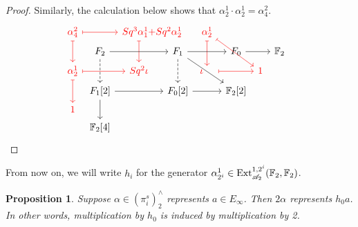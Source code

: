 \documentclass[11pt, titlepage]{article} %
\def\bb{\ensuremath\mathbb}
\def\A{\ensuremath{\mathscr{A}_2}}
\DeclareMathOperator{\Ext}{Ext}
\def\textcolour{\textcolor}
\numberwithin{equation}{subsection}
\theoremstyle{plain}
\newtheorem{proposition}[theorem]{Proposition}
\theoremstyle{definition}
\begin{document}
\begin{proof}
Similarly, the calculation below shows that \(\alpha^1_2\cdot \alpha^1_2=\alpha^2_4\).
\[\begin{tikzcd}[row sep = 0.8ex, column sep=0.8ex]
\textcolour{red}{\alpha^2_4} \arrow[rr, "", mapsto, red] \arrow[dd, swap, "", red, mapsto]  & & \textcolour{red}{Sq^3\alpha^1_1}\textcolour{red}{+}\mathrlap{\textcolour{red}{Sq^2\alpha^1_2}}  \arrow[dd, ""', red, mapsto] & & \textcolour{red}{\alpha^{1}_{2}}  \arrow[dd, ""', red, mapsto] \arrow[rrdd, "", red, mapsto] & && \\
& F_2 \arrow[rr, swap, ""] \arrow[dd, ""', dashrightarrow] & & F_{1} \arrow[dd, ""', dashrightarrow] \arrow[rr, ""'] \arrow[rrdd] & & F_0 \arrow[rr] && \bb{F}_2 \\
\textcolour{red}{\alpha^1_2} \arrow[rr, swap, "", red, mapsto] \arrow[dd, ""', red, mapsto] & & \textcolour{red}{Sq^2\iota} & & \textcolour{red}{\iota}\;\;\;\; \arrow[rr, ""', red, mapsto] & & \textcolour{red}{1} & & & \\
& F_1[2] \arrow[rr, swap, ""] \arrow[dd, ""'] & & F_0[2] \arrow[rr, ""'] & & \bb{F}_2[2] & &\\
\textcolour{red}{1} & &&&&&&\\
& \bb{F}_2[4] &&&&&&
\end{tikzcd}\]
\end{proof}

From now on, we will write \(h_i\) for the generator \(\alpha^1_{2^i}\in \Ext^{1, 2^i}_{\A}(\bb{F}_2, \bb{F}_2)\).

\begin{proposition}
Suppose \(\alpha \in (\pi_i^s)^\wedge_2\) represents \(a \in E_\infty\). Then \(2\alpha\) represents \(h_0a\). In other words, multiplication by \(h_0\) is induced by multiplication by 2. 
\end{proposition}
\end{document}
